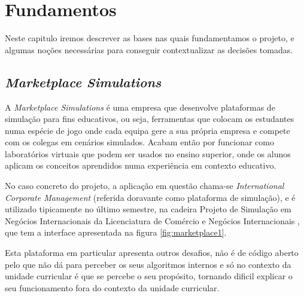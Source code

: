 

\section{Fundamentos}
\label{sec:fundamentos}

Neste capitulo iremos descrever as bases nas quais fundamentamos o projeto, e algumas noções necessárias para conseguir contextualizar as decisões tomadas.

\subsection{\textit{Marketplace Simulations}}
\label{sec:marketplace}

A \textit{Marketplace Simulations} \cite{MarketplaceSim_2025} é uma empresa que desenvolve plataformas de simulação para fins educativos, ou seja, ferramentas que colocam os estudantes numa espécie de jogo onde cada equipa gere a sua própria empresa e compete com os colegas em cenários simulados. Acabam então por funcionar como laboratórios virtuais que podem ser usados no ensino superior, onde os alunos aplicam os conceitos aprendidos numa experiência em contexto educativo.

No caso concreto do projeto, a aplicação em questão chama-se \textit{International Corporate Management} (referida doravante como plataforma de simulação), e é utilizado tipicamente no último semestre, na cadeira Projeto de Simulação em Negócios Internacionais da Licenciatura de Comércio e Negócios Internacionais \cite{FUC_ISCAL_2025}, que tem a interface apresentada na figura \ref{fig:marketplace1}.

Esta plataforma em particular apresenta outros desafios, não é de código aberto pelo que não dá para perceber os seus algoritmos internos e só no contexto da unidade curricular é que se percebe o seu propósito, tornando dificil explicar o seu funcionamento fora do contexto da unidade curricular.


